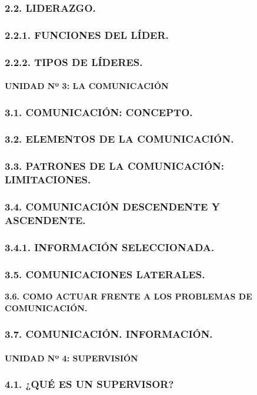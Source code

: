\subsubsection*{2.2. LIDERAZGO.}
\subsubsection*{2.2.1. FUNCIONES DEL LÍDER.}
\subsubsection*{2.2.2. TIPOS DE LÍDERES.}
\paragraph*{UNIDAD Nº 3: LA COMUNICACIÓN}
\subsubsection*{3.1. COMUNICACIÓN: CONCEPTO.}
\subsubsection*{3.2. ELEMENTOS DE LA COMUNICACIÓN.}
\subsubsection*{3.3. PATRONES DE LA COMUNICACIÓN: LIMITACIONES.}
\subsubsection*{3.4. COMUNICACIÓN DESCENDENTE Y ASCENDENTE.}
\subsubsection*{3.4.1. INFORMACIÓN SELECCIONADA.}
\subsubsection*{3.5. COMUNICACIONES LATERALES.}
\textbf{3.6. COMO ACTUAR FRENTE A LOS PROBLEMAS DE COMUNICACIÓN.}

\subsubsection*{3.7. COMUNICACIÓN. INFORMACIÓN.}
\paragraph*{UNIDAD Nº 4: SUPERVISIÓN}
\subsubsection*{4.1. ¿QUÉ ES UN SUPERVISOR?}

